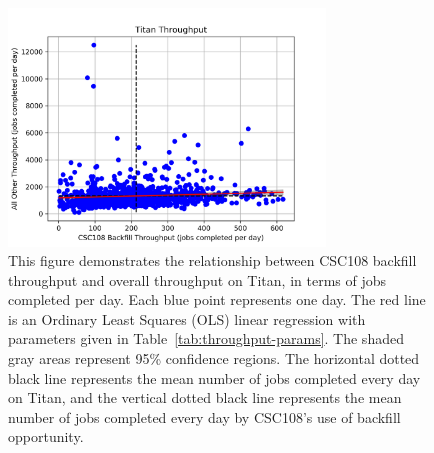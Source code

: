 \begin{figure}
  \includegraphics[width=0.75\textwidth]{images/linfit-throughput-all.png}
\caption{This figure demonstrates the relationship between CSC108 backfill
throughput and overall throughput on Titan, in terms of jobs completed per day.
Each blue point represents one day. The red line is an Ordinary Least Squares
(OLS) linear regression with parameters given in
Table~\ref{tab:throughput-params}. The shaded gray areas represent 95\%
confidence regions. The horizontal dotted black line represents the mean number
of jobs completed every day on Titan, and the vertical dotted black line
represents the mean number of jobs completed every day by CSC108's use of
backfill opportunity.}
\label{fig:throughput-all}
\end{figure}

